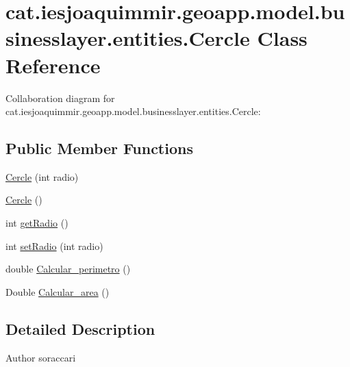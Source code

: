 \hypertarget{classcat_1_1iesjoaquimmir_1_1geoapp_1_1model_1_1businesslayer_1_1entities_1_1_cercle}{}\section{cat.\+iesjoaquimmir.\+geoapp.\+model.\+businesslayer.\+entities.\+Cercle Class Reference}
\label{classcat_1_1iesjoaquimmir_1_1geoapp_1_1model_1_1businesslayer_1_1entities_1_1_cercle}


Collaboration diagram for cat.\+iesjoaquimmir.\+geoapp.\+model.\+businesslayer.\+entities.\+Cercle\+:
\subsection*{Public Member Functions}
\begin{DoxyCompactItemize}
\item 
\mbox{\hyperlink{classcat_1_1iesjoaquimmir_1_1geoapp_1_1model_1_1businesslayer_1_1entities_1_1_cercle_ac9f65e0170c27b33308141ea13fcb81c}{Cercle}} (int radio)
\item 
\mbox{\hyperlink{classcat_1_1iesjoaquimmir_1_1geoapp_1_1model_1_1businesslayer_1_1entities_1_1_cercle_a9a65cf4efeb503d9b987b1f01d43b5ce}{Cercle}} ()
\item 
int \mbox{\hyperlink{classcat_1_1iesjoaquimmir_1_1geoapp_1_1model_1_1businesslayer_1_1entities_1_1_cercle_a1208711e46ccd2f735c21512eb056e15}{get\+Radio}} ()
\item 
int \mbox{\hyperlink{classcat_1_1iesjoaquimmir_1_1geoapp_1_1model_1_1businesslayer_1_1entities_1_1_cercle_a81d34d0978a955fb55678948f8f55afd}{set\+Radio}} (int radio)
\item 
double \mbox{\hyperlink{classcat_1_1iesjoaquimmir_1_1geoapp_1_1model_1_1businesslayer_1_1entities_1_1_cercle_a0dd2c2b9a0829481b57faf2289435825}{Calcular\+\_\+perimetro}} ()
\item 
Double \mbox{\hyperlink{classcat_1_1iesjoaquimmir_1_1geoapp_1_1model_1_1businesslayer_1_1entities_1_1_cercle_a5465f1358a1f4c89547da8a88dba73ea}{Calcular\+\_\+area}} ()
\end{DoxyCompactItemize}


\subsection{Detailed Description}
\begin{DoxyAuthor}{Author}
soraccari 
\end{DoxyAuthor}


